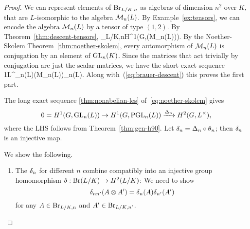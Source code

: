\begin{proof}
We can represent elements of $\Br_{L/K,n}$ as algebras of dimension $n^2$ over $K$, that are $L$-isomorphic to the algebra $\cal M_n(L)$. By Example~\ref{ex:tensors}, we can encode the algebra $\cal M_n(L)$ by a tensor of type $(1,2)$. By Theorem~\ref{thm:descent-tensors},
\Br_{L/K,n}\cong H^1(G,\Aut(\cal M_n(L))).
\eeq
By the Noether-Skolem Theorem~\ref{thm:noether-skolem}, every automorphism of $\cal M_n(L)$ is conjugation by an element of $\GL_n(K)$. Since the matrices that act trivially by conjugation are just the scalar matrices, we have the short exact sequence
1\to L^{\times}\to \GL_n(L)\to \Aut(\cal M_n(L))\cong \PGL_n(L).
\eeq
Along with~(\ref{eq:brauer-descent}) this proves the first part.

The long exact sequence \ref{thm:nonabelian-les} of~\eqref{eq:noether-skolem} gives 
\[
0=H^1(G,\GL_n(L))\to H^1(G,\PGL_n(L))\xra{\De_n} H^2(G,L^{\times}),
\]
where the LHS follows from Theorem~\ref{thm:gen-h90}. Let $\de_n=\De_n\circ \te_n$; then $\de_n$ is an injective map.

We show the following.
\begin{enumerate}
\item The $\de_n$ for different $n$ combine compatibly into an injective group homomorphism $\de:\Br(L/K)\to H^2(L/K)$: 
We need to show
\[
\de_{nn'}(A\ot A')=\de_n(A)\de_{n'}(A')
\]
for any $A\in \Br_{L/K,n}$ and $A'\in \Br_{L/K,n'}$.


\end{enumerate}
\end{proof}
